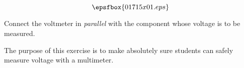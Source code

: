 

$$\epsfbox{01715x01.eps}$$

\vfil \eject






Connect the voltmeter in {\it parallel} with the component whose voltage is to be measured.







The purpose of this exercise is to make absolutely sure students can safely measure voltage with a multimeter.  




